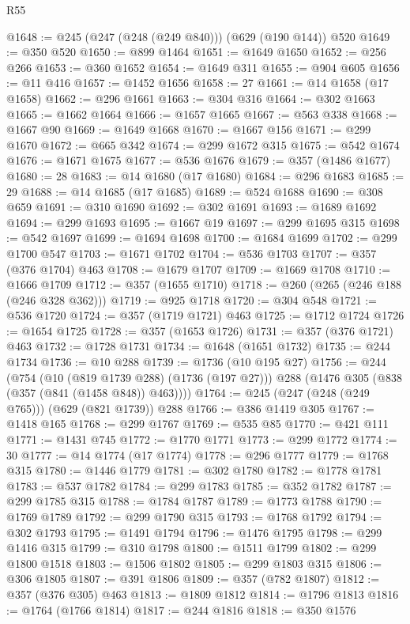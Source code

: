 \begin{lexlean}{R55}
\begin{coremodule}
@1648 := @245 (@247 (@248 (@249 @840))) (@629 (@190 @144)) @520
@1649 := @350 @520
@1650 := @899 @1464
@1651 := @1649 @1650
@1652 := @256 @266
@1653 := @360 @1652
@1654 := @1649 @311
@1655 := @904 @605
@1656 := @11 @416
@1657 := @1452 @1656
@1658 := 27
@1661 := @14 @1658 (@17 @1658)
@1662 := @296 @1661
@1663 := @304 @316
@1664 := @302 @1663
@1665 := @1662 @1664
@1666 := @1657 @1665
@1667 := @563 @338
@1668 := @1667 @90
@1669 := @1649 @1668
@1670 := @1667 @156
@1671 := @299 @1670
@1672 := @665 @342
@1674 := @299 @1672 @315
@1675 := @542 @1674
@1676 := @1671 @1675
@1677 := @536 @1676
@1679 := @357 (@1486 @1677)
@1680 := 28
@1683 := @14 @1680 (@17 @1680)
@1684 := @296 @1683
@1685 := 29
@1688 := @14 @1685 (@17 @1685)
@1689 := @524 @1688
@1690 := @308 @659
@1691 := @310 @1690
@1692 := @302 @1691
@1693 := @1689 @1692
@1694 := @299 @1693
@1695 := @1667 @19
@1697 := @299 @1695 @315
@1698 := @542 @1697
@1699 := @1694 @1698
@1700 := @1684 @1699
@1702 := @299 @1700 @547
@1703 := @1671 @1702
@1704 := @536 @1703
@1707 := @357 (@376 @1704) @463
@1708 := @1679 @1707
@1709 := @1669 @1708
@1710 := @1666 @1709
@1712 := @357 (@1655 @1710)
@1718 := @260 (@265 (@246 @188 (@246 @328 @362)))
@1719 := @925 @1718
@1720 := @304 @548
@1721 := @536 @1720
@1724 := @357 (@1719 @1721) @463
@1725 := @1712 @1724
@1726 := @1654 @1725
@1728 := @357 (@1653 @1726)
@1731 := @357 (@376 @1721) @463
@1732 := @1728 @1731
@1734 := @1648 (@1651 @1732)
@1735 := @244 @1734
@1736 := @10 @288
@1739 := @1736 (@10 @195 @27)
@1756 := @244
    (@754
      (@10 (@819 @1739 @288) (@1736 (@197 @27)))
      @288
      (@1476 @305 (@838 (@357 (@841 (@1458 @848)) @463))))
@1764 := @245 (@247 (@248 (@249 @765))) (@629 (@821 @1739)) @288
@1766 := @386 @1419 @305
@1767 := @1418 @165
@1768 := @299 @1767
@1769 := @535 @85
@1770 := @421 @111
@1771 := @1431 @745
@1772 := @1770 @1771
@1773 := @299 @1772
@1774 := 30
@1777 := @14 @1774 (@17 @1774)
@1778 := @296 @1777
@1779 := @1768 @315
@1780 := @1446 @1779
@1781 := @302 @1780
@1782 := @1778 @1781
@1783 := @537 @1782
@1784 := @299 @1783
@1785 := @352 @1782
@1787 := @299 @1785 @315
@1788 := @1784 @1787
@1789 := @1773 @1788
@1790 := @1769 @1789
@1792 := @299 @1790 @315
@1793 := @1768 @1792
@1794 := @302 @1793
@1795 := @1491 @1794
@1796 := @1476 @1795
@1798 := @299 @1416 @315
@1799 := @310 @1798
@1800 := @1511 @1799
@1802 := @299 @1800 @1518
@1803 := @1506 @1802
@1805 := @299 @1803 @315
@1806 := @306 @1805
@1807 := @391 @1806
@1809 := @357 (@782 @1807)
@1812 := @357 (@376 @305) @463
@1813 := @1809 @1812
@1814 := @1796 @1813
@1816 := @1764 (@1766 @1814)
@1817 := @244 @1816
@1818 := @350 @1576

\end{coremodule}
\end{lexlean}
